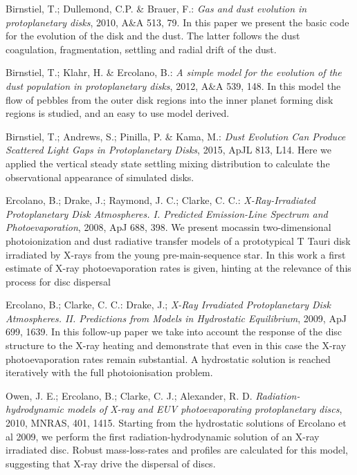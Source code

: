 \documentclass[10pt,fleqn,twoside]{article}
\newenvironment{literature}%
 {\begin{multicols}{2}\begin{small}\begin{list}{}{%
   \setlength{\topsep}{0em}%
   \setlength{\parskip}{0em}%
   \setlength{\parsep}{0em}%
   \setlength{\itemsep}{0em}%
   \setlength{\rightmargin}{0em}%
   \setlength{\leftmargin}{2em}%
   \setlength{\itemindent}{-2em}}}%
 {\end{list}\end{small}\end{multicols}}
\begin{document}
\begin{literature}
\item Birnstiel, T.; Dullemond, C.P. \& Brauer, F.: \textit{Gas and
dust evolution in protoplanetary disks}, 2010, A\&A 513, 79. In this paper we
  present the basic code for the evolution of the disk and the dust. The
  latter follows the dust coagulation, fragmentation, settling and radial
  drift of the dust.
  
\item Birnstiel, T.; Klahr, H. \& Ercolano, B.: \textit{A simple model
for the evolution of the dust population in protoplanetary disks}, 
  2012, A\&A 539, 148. In this model the flow of pebbles from the outer
  disk regions into the inner planet forming disk regions is studied,
  and an easy to use model derived.
  
\item Birnstiel, T.; Andrews, S.; Pinilla, P. \& Kama, M.:
\textit{Dust Evolution Can Produce Scattered Light Gaps in Protoplanetary Disks},
2015, ApJL 813, L14. Here we applied the vertical steady state
settling mixing distribution to calculate the observational appearance
of simulated disks.
  
\item Ercolano, B.; Drake, J.; Raymond, J. C.; Clarke, C. C.:
\textit{X-Ray-Irradiated Protoplanetary Disk Atmospheres. I. Predicted Emission-Line Spectrum and Photoevaporation},
2008, ApJ 688, 398. We present mocassin two-dimensional
photoionization and dust radiative transfer models of a prototypical T
Tauri disk irradiated by X-rays from the young pre-main-sequence
star. In this work a first estimate of X-ray photoevaporation rates is
given, hinting at the relevance of this process for disc dispersal

\item Ercolano, B.; Clarke, C. C.: Drake, J.;
\textit{X-Ray Irradiated Protoplanetary Disk Atmospheres. II. Predictions from Models in Hydrostatic Equilibrium},
2009, ApJ 699, 1639. In this follow-up paper we take into account the
response of the disc structure to the X-ray heating and demonstrate
that even in this case the X-ray photoevaporation rates remain
substantial. A hydrostatic solution is reached iteratively with the
full photoionisation problem. 

\item Owen, J. E.; Ercolano, B.; Clarke, C. J.; Alexander, R. D.
\textit{Radiation-hydrodynamic models of X-ray and EUV photoevaporating protoplanetary discs},
2010, MNRAS, 401, 1415. Starting from the hydrostatic solutions of
Ercolano et al 2009, we perform the first radiation-hydrodynamic
solution of an X-ray irradiated disc. Robust mass-loss-rates and
profiles are calculated for this model, suggesting that X-ray drive
the dispersal of discs. 


\end{literature}
\end{document}
